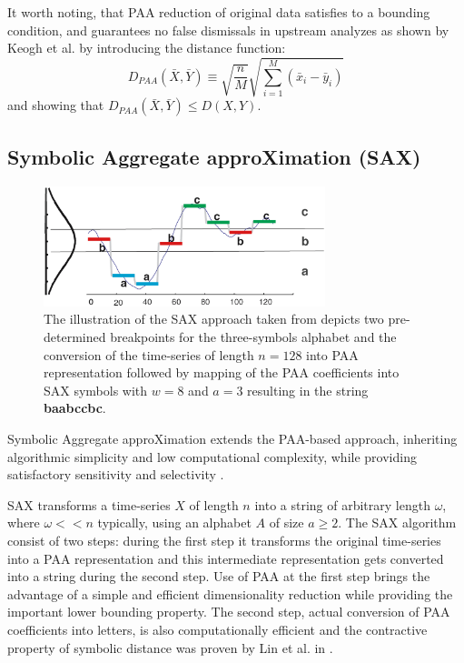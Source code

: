 \documentclass[conference]{worldcomp}
\begin{document}
It worth noting, that PAA reduction of original data satisfies to a bounding condition, and 
guarantees no false dismissals in upstream analyzes as shown by Keogh et al. \cite{citeulike:3000416}
by introducing the distance function:
\begin{equation}
D_{PAA}(\bar{X}, \bar{Y}) \equiv \sqrt{\frac{n}{M}} \sqrt{ \sum_{i=1}^{M} 
\left(  \bar{x}_{i} - \bar{y}_{i} \right)}
\label{eq:paa_distance}
\end{equation}
and showing that $D_{PAA}(\bar{X}, \bar{Y}) \leq D(X,Y)$.

\subsection{Symbolic Aggregate approXimation (SAX)} \label{sax}
\begin{figure}[b]
   \centering
   \includegraphics[height=35mm]{figures/sax_intro.eps}
   \caption{The illustration of the SAX approach taken from \cite{citeulike:2821475} depicts 
    two pre-determined breakpoints for the three-symbols alphabet and the conversion of the time-series of 
    length $n=128$ into PAA representation followed by mapping of the PAA coefficients into SAX symbols with 
    $w=8$ and $a=3$ resulting in the string \textbf{baabccbc}.}
   \label{fig:sax_intro}
\end{figure}

Symbolic Aggregate approXimation extends the PAA-based approach, inheriting algorithmic 
simplicity and low computational complexity, while providing satisfactory sensitivity and 
selectivity \cite{citeulike:2821475}. 

SAX transforms a time-series $X$ of length $n$ into a string of arbitrary length $\omega$, 
where $\omega << n$ typically, using an alphabet $A$ of size $ a \geq 2$. 
The SAX algorithm consist of two steps: during the first step it transforms the original time-series 
into a PAA representation and this intermediate representation gets converted into a string during the second step. 
Use of PAA at the first step brings the advantage of a simple and efficient dimensionality reduction while 
providing the important lower bounding property. 
The second step, actual conversion of PAA coefficients into letters, is also computationally efficient 
and the contractive property of symbolic distance was proven by Lin et al. in \cite{citeulike:532335}.
\end{document}
